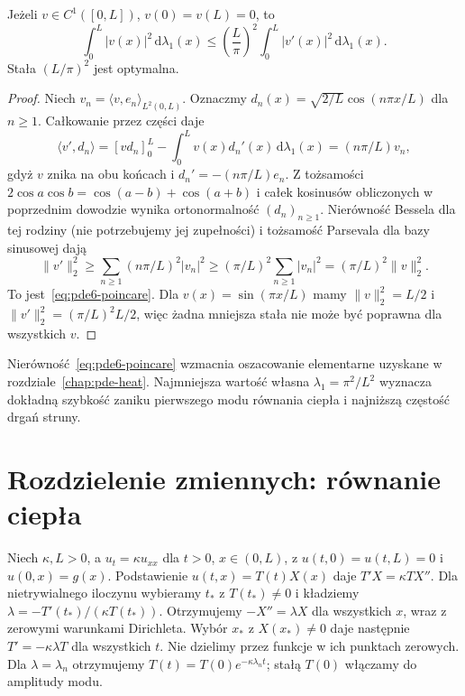 \begin{wniosek}
\label{cor:pde6-poincare}
Jeżeli $v\in C^1([0,L])$, $v(0)=v(L)=0$, to
\begin{equation}\label{eq:pde6-poincare}
 \int_0^L|v(x)|^2\,\mathrm d\lambda_1(x)
 \le \left(\frac L\pi\right)^2
 \int_0^L|v'(x)|^2\,\mathrm d\lambda_1(x).
\end{equation}
Stała $(L/\pi)^2$ jest optymalna.
\end{wniosek}
\begin{proof}
Niech $v_n=\langle v,e_n\rangle_{L^2(0,L)}$.
Oznaczmy $d_n(x)=\sqrt{2/L}\cos(n\pi x/L)$
dla $n\ge1$. Całkowanie przez części daje
\[
 \langle v',d_n\rangle
 = [v d_n]_0^L-\int_0^L v(x)d_n'(x)\,
 \mathrm d\lambda_1(x)
 = (n\pi/L)v_n,
\]
gdyż $v$ znika na obu końcach i $d_n'=-(n\pi/L)e_n$.
Z tożsamości $2\cos a\cos b=\cos(a-b)+\cos(a+b)$
i całek kosinusów obliczonych w poprzednim dowodzie
wynika ortonormalność $(d_n)_{n\ge1}$.
Nierówność Bessela dla tej rodziny (nie potrzebujemy
jej zupełności) i tożsamość Parsevala dla bazy sinusowej dają
\[
 \|v'\|_2^2\ge\sum_{n\ge1}(n\pi/L)^2|v_n|^2
 \ge(\pi/L)^2\sum_{n\ge1}|v_n|^2
 =(\pi/L)^2\|v\|_2^2.
\]
To jest~\eqref{eq:pde6-poincare}. Dla
$v(x)=\sin(\pi x/L)$ mamy $\|v\|_2^2=L/2$ i
$\|v'\|_2^2=(\pi/L)^2 L/2$, więc żadna mniejsza
stała nie może być poprawna dla wszystkich $v$.
\end{proof}

\begin{uwaga}
Nierówność~\eqref{eq:pde6-poincare} wzmacnia
oszacowanie elementarne uzyskane w rozdziale~\ref{chap:pde-heat}.
Najmniejsza wartość własna $\lambda_1=\pi^2/L^2$
wyznacza dokładną szybkość zaniku pierwszego modu
równania ciepła i najniższą częstość drgań struny.
\end{uwaga}

\section{Rozdzielenie zmiennych: równanie ciepła}
\label{sec:pde6-heat}

Niech $\kappa,L>0$, a $u_t=\kappa u_{xx}$ dla $t>0$,
$x\in(0,L)$, z $u(t,0)=u(t,L)=0$ i $u(0,x)=g(x)$.
Podstawienie $u(t,x)=T(t)X(x)$ daje
$T'X=\kappa TX''$. Dla nietrywialnego iloczynu wybieramy
$t_*$ z $T(t_*)\ne0$ i kładziemy
$\lambda=-T'(t_*)/(\kappa T(t_*))$. Otrzymujemy
$-X''=\lambda X$ dla wszystkich $x$, wraz z zerowymi
warunkami Dirichleta. Wybór $x_*$ z $X(x_*)\ne0$
daje następnie $T'=-\kappa\lambda T$ dla wszystkich $t$.
Nie dzielimy przez funkcje w ich punktach zerowych.
Dla $\lambda=\lambda_n$ otrzymujemy
$T(t)=T(0)e^{-\kappa\lambda_nt}$; stałą $T(0)$ włączamy
do amplitudy modu.


